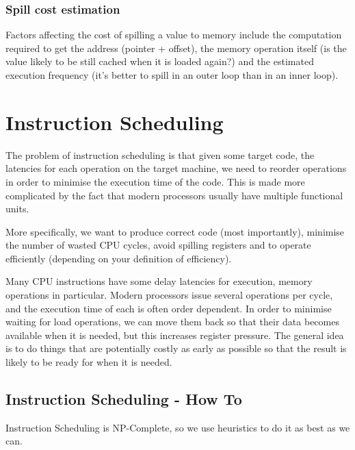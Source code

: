 \subsubsection{Spill cost estimation}

Factors affecting the cost of spilling a value to memory include the
computation required to get the address (pointer + offset), the memory
operation itself (is the value likely to be still cached when it is
loaded again?) and the estimated execution frequency (it's better to
spill in an outer loop than in an inner loop).


\section{Instruction Scheduling}

The problem of instruction scheduling is that given some target code,
the latencies for each operation on the target machine, we need to
reorder operations in order to minimise the execution time of the
code. This is made more complicated by the fact that modern processors
usually have multiple functional units.

More specifically, we want to produce correct code (most importantly),
minimise the number of wasted CPU cycles, avoid spilling registers and
to operate efficiently (depending on your definition of efficiency).

Many CPU instructions have some delay latencies for execution, memory
operations in particular. Modern processors issue several operations
per cycle, and the execution time of each is often order dependent. In
order to minimise waiting for load operations, we can move them back
so that their data becomes available when it is needed, but this
increases register pressure. The general idea is to do things that are
potentially costly as early as possible so that the result is likely
to be ready for when it is needed.


\subsection{Instruction Scheduling - How To}

Instruction Scheduling is NP-Complete, so we use heuristics to do it as best as we can.

